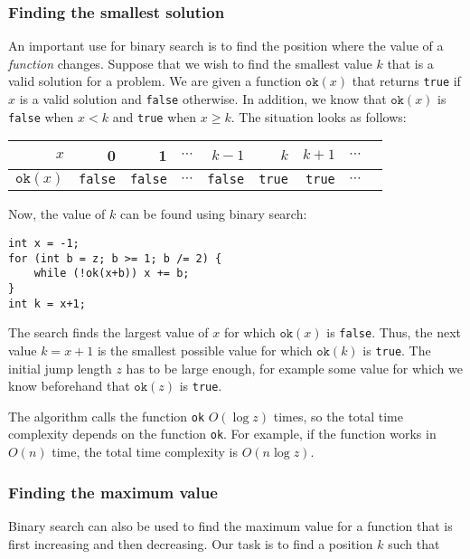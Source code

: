 \subsubsection{Finding the smallest solution}

An important use for binary search is
to find the position where the value of a \emph{function} changes.
Suppose that we wish to find the smallest value $k$
that is a valid solution for a problem.
We are given a function $\texttt{ok}(x)$
that returns \texttt{true} if $x$ is a valid solution
and \texttt{false} otherwise.
In addition, we know that $\texttt{ok}(x)$ is \texttt{false}
when $x<k$ and \texttt{true} when $x \ge k$.
The situation looks as follows:

\begin{center}
\begin{tabular}{r|rrrrrrrr}
$x$ & 0 & 1 & $\cdots$ & $k-1$ & $k$ & $k+1$ & $\cdots$ \\
\hline
$\texttt{ok}(x)$ & \texttt{false} & \texttt{false}
& $\cdots$ & \texttt{false} & \texttt{true} & \texttt{true} & $\cdots$ \\
\end{tabular}
\end{center}

\noindent
Now, the value of $k$ can be found using binary search:

\begin{lstlisting}
int x = -1;
for (int b = z; b >= 1; b /= 2) {
    while (!ok(x+b)) x += b;
}
int k = x+1;
\end{lstlisting}

The search finds the largest value of $x$ for which
$\texttt{ok}(x)$ is \texttt{false}.
Thus, the next value $k=x+1$
is the smallest possible value for which
$\texttt{ok}(k)$ is \texttt{true}.
The initial jump length $z$ has to be
large enough, for example some value
for which we know beforehand that $\texttt{ok}(z)$ is \texttt{true}.

The algorithm calls the function \texttt{ok}
$O(\log z)$ times, so the total time complexity
depends on the function \texttt{ok}.
For example, if the function works in $O(n)$ time,
the total time complexity is $O(n \log z)$.

\subsubsection{Finding the maximum value}

Binary search can also be used to find
the maximum value for a function that is
first increasing and then decreasing.
Our task is to find a position $k$ such that

